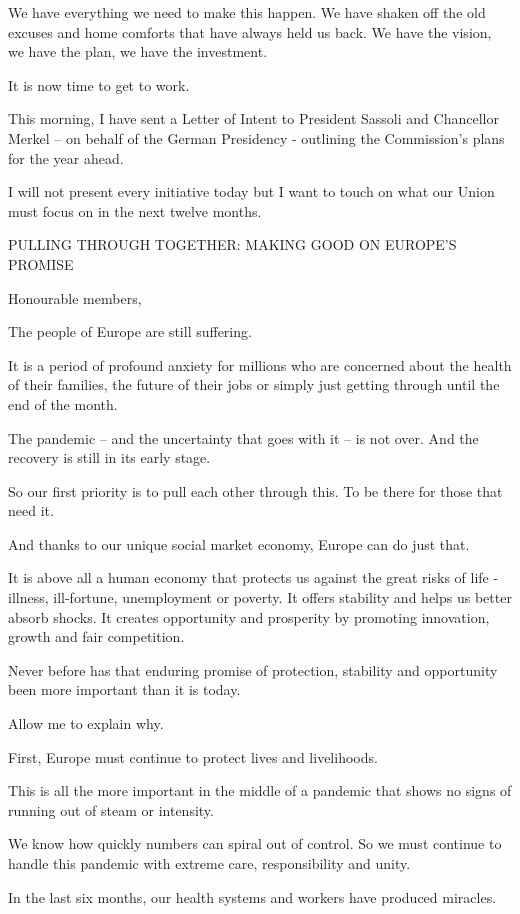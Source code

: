 \documentclass[a4paper,11pt]{article}
\begin{document}
We have everything we need to make this happen. We have shaken off the old excuses and home comforts that have always held us back. We have the vision, we have the plan, we have the investment.

It is now time to get to work.

This morning, I have sent a Letter of Intent to President Sassoli and Chancellor Merkel – on behalf of the German Presidency - outlining the Commission's plans for the year ahead.

I will not present every initiative today but I want to touch on what our Union must focus on in the next twelve months.

 

PULLING THROUGH TOGETHER: MAKING GOOD ON EUROPE'S PROMISE

Honourable members,

The people of Europe are still suffering.

It is a period of profound anxiety for millions who are concerned about the health of their families, the future of their jobs or simply just getting through until the end of the month.

The pandemic – and the uncertainty that goes with it – is not over. And the recovery is still in its early stage.

So our first priority is to pull each other through this. To be there for those that need it.

And thanks to our unique social market economy, Europe can do just that.

It is above all a human economy that protects us against the great risks of life - illness, ill-fortune, unemployment or poverty. It offers stability and helps us better absorb shocks. It creates opportunity and prosperity by promoting innovation, growth and fair competition.

Never before has that enduring promise of protection, stability and opportunity been more important than it is today.

Allow me to explain why.

First, Europe must continue to protect lives and livelihoods.

This is all the more important in the middle of a pandemic that shows no signs of running out of steam or intensity.

We know how quickly numbers can spiral out of control. So we must continue to handle this pandemic with extreme care, responsibility and unity.

In the last six months, our health systems and workers have produced miracles.
\end{document}
